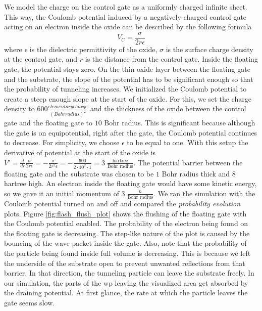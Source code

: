 We model the charge on the control gate as a uniformly charged infinite sheet.
This way, the Coulomb potential induced by a negatively charged control gate acting on an electron inside the oxide can be described by the following formula
\begin{equation}
	\label{eq:coulomb_potential}
	V_C = \frac{\sigma}{2r\epsilon}
\end{equation}
where $\epsilon$ is the dielectric permittivity of the oxide, $\sigma$ is the surface charge density at the control gate, and $r$ is the distance from the control gate.
Inside the floating gate, the potential stays zero.
On the thin oxide layer between the floating gate and the substrate, the slope of the potential has to be significant enough so that the probability of tunneling increases.
We initialized the Coulomb potential to create a steep enough slope at the start of the oxide.
For this, we set the charge density to $600 \frac{elementary charge}{(Bohr radius)^2}$ and the thickness of the oxide between the control gate and the floating gate to $10$ Bohr radius.
This is significant because although the gate is on equipotential, right after the gate, the Coulomb potential continues to decrease.
For simplicity, we choose $\epsilon$ to be equal to one.
With this setup the derivative of potential at the start of the oxide is $V' = \frac{d}{dr}\frac{\sigma}{2r\epsilon} = -\frac{\sigma}{2r^2\epsilon} = -\frac{600}{2\cdot 10^2\cdot 1} = 3\; \frac{\text{hartree}}{\text{Bohr radius}}$.
The potential barrier between the floating gate and the substrate was chosen to be $1$ Bohr radius thick and $8$ hartree high.
An electron inside the floating gate would have some kinetic energy, so we gave it an initial momentum of $3\; \frac{\hbar}{\text{Bohr radius}}$.
We ran the simulation with the Coulomb potential turned on and off and compared the \textit{probability evolution} plots.
Figure \ref{fig:flash_flush_plot} shows the flushing of the floating gate with the Coulomb potential enabled.
The probability of the electron being found on the floating gate is decreasing.
The step-like nature of the plot is caused by the bouncing of the wave packet inside the gate.
Also, note that the probability of the particle being found inside full volume is decreasing.
This is because we left the underside of the substrate open to prevent unwanted reflections from that barrier.
In that direction, the tunneling particle can leave the substrate freely.
In our simulation, the parts of the \acrshort{wp} leaving the visualized area get absorbed by the draining potential.
At first glance, the rate at which the particle leaves the gate seems slow.
